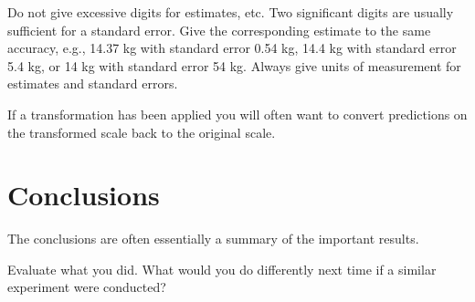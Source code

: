 \documentclass[12pt,a4paper]{article}
\begin{document}
Do not give excessive digits for estimates, etc. Two significant digits are usually suﬀicient
for a standard error. Give the corresponding estimate to the same accuracy, e.g., 14.37 kg
with standard error 0.54 kg, 14.4 kg with standard error 5.4 kg, or 14 kg with standard
error 54 kg. Always give units of measurement for estimates and standard errors.

If a transformation has been applied you will often want to convert predictions on the
transformed scale back to the original scale.

\section{Conclusions}\label{section4}

The conclusions are often essentially a summary of the
important results.

Evaluate what you did. What would you do differently next time if a similar experiment
were conducted?



\printbibliography




\end{document}
